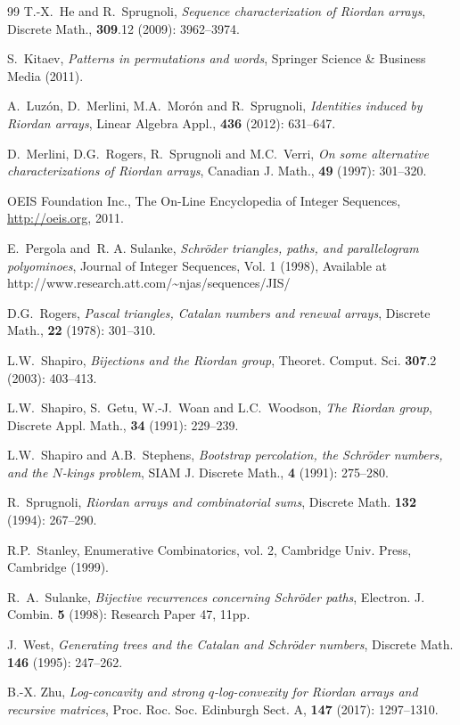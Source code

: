 \documentclass[11pt,reqno]{amsart}
\numberwithin{equation}{section}
\theoremstyle{plain}
\theoremstyle{definition}
\begin{document}
\begin{thebibliography}{99}
 T.-X.~He and R.~Sprugnoli, \textit{Sequence characterization of Riordan arrays}, Discrete Math., {\bf 309}.12 (2009): 3962--3974.

S.~Kitaev, \emph{Patterns in permutations and words}, Springer Science \& Business Media (2011).

 A.~Luz\'on, D.~Merlini, M.A.~Mor\'on and R.~Sprugnoli, \textit{Identities induced by Riordan arrays}, Linear Algebra Appl., {\bf 436} (2012): 631--647.

 D.~Merlini, D.G.~Rogers, R.~Sprugnoli and M.C.~Verri, \textit{On some alternative characterizations of Riordan arrays}, Canadian J. Math., {\bf 49} (1997): 301--320.

 OEIS Foundation Inc., The On-Line Encyclopedia of Integer Sequences,  \href{http://oeis.org}{http://oeis.org}, 2011.

 E.~Pergola and~R. A. Sulanke, \textit{Schr\"oder triangles, paths, and parallelogram polyominoes}, Journal of Integer Sequences, Vol. 1 (1998), Available at http://www.research.att.com/\~{}njas/sequences/JIS/

 D.G.~Rogers, \textit{Pascal triangles, Catalan numbers and renewal arrays}, Discrete Math., {\bf 22} (1978): 301--310.

 L.W.~Shapiro, \textit{Bijections and the Riordan group}, Theoret. Comput. Sci. {\bf 307}.2 (2003): 403--413.

 L.W.~Shapiro, S.~Getu, W.-J.~Woan and L.C.~Woodson, \textit{The Riordan group}, Discrete Appl. Math., {\bf 34} (1991): 229--239.

 L.W.~Shapiro and A.B.~Stephens, \textit{Bootstrap percolation, the Schr\"oder numbers, and the $N$-kings problem}, SIAM J. Discrete Math., {\bf 4} (1991): 275--280.

 R.~Sprugnoli, \textit{Riordan arrays and combinatorial sums}, Discrete Math. \textbf{132} (1994): 267--290.



 R.P.~Stanley, Enumerative Combinatorics, vol. 2, Cambridge Univ. Press, Cambridge (1999).

 R.~A.~Sulanke, \textit{Bijective recurrences concerning Schr\"oder paths}, Electron. J. Combin. {\bf 5} (1998): Research Paper 47, 11pp.

 J.~West, \textit{Generating trees and the Catalan and Schr\"oder numbers}, Discrete Math. {\bf 146} (1995): 247--262.

 B.-X. Zhu, \textit{Log-concavity and strong $q$-log-convexity for Riordan arrays and recursive matrices}, Proc. Roc. Soc. Edinburgh Sect. A, {\bf 147} (2017): 1297--1310.

\end{thebibliography}
\end{document}
